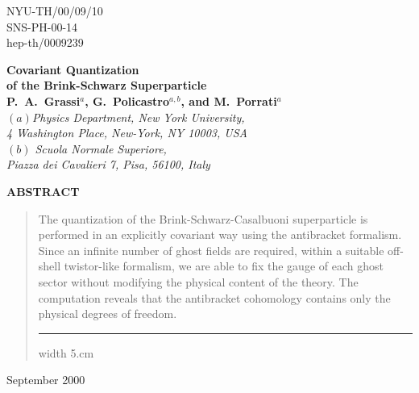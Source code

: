 \documentclass[a4paper,12pt]{article}
\renewcommand{\theequation}{\thesection.\arabic{equation}}
\begin{document}
\begin{titlepage}
\begin{flushright}
NYU-TH/00/09/10 \\
SNS-PH-00-14 \\
hep-th/0009239
\end{flushright}
\vfill
\begin{center}
{\LARGE\bf Covariant Quantization \\ of the Brink-Schwarz Superparticle}    \\
  \large
{\bf  P.~A.~Grassi$^a$, G.~Policastro$^{a,b}$,  and  M.~Porrati$^a$}\\
\vfill
{\small \it
$(a)$Physics Department,  New York University, \\ 
4 Washington Place, New-York,  NY 10003,  USA \\ 
\vspace{.2cm}
$(b)$ Scuola Normale Superiore, \\
Piazza dei Cavalieri  7, Pisa, 56100, Italy \\}
\end{center}
\vfill

\begin{center}
{\bf ABSTRACT}
\end{center}
\begin{quote}
  The quantization of the Brink-Schwarz-Casalbuoni superparticle is
  performed in an explicitly covariant way using the antibracket
  formalism.  Since an infinite number of ghost fields are required,
  within a suitable off-shell twistor-like formalism, we are able to
  fix the gauge of each ghost sector without modifying the physical
  content of the theory. The computation reveals that the antibracket
  cohomology contains only the physical degrees of freedom.  \vfill
  \hrule width 5.cm 
\end{quote}
\begin{flushleft}
September 2000
\end{flushleft}
\end{titlepage}


\newcommand{\note}[1]{{\tiny (note)}\marginpar {\scriptsize #1}}
\renewcommand{\thefootnote}{\fnsymbol{footnote}}
\newcommand{\ghe}[2]{$\stackrel{\textstyle #1}{\scriptstyle (#2)}$}
\newcommand{\lre}{\multicolumn{3}{c}{$\stackrel{*}{\longleftrightarrow}$}} 

\def\SL#1{\rlap{\hbox{$\mskip 4.5 mu /$}}#1}     %
\renewcommand {\theequation}{\arabic{section}.\arabic{equation}}
\end{document}

